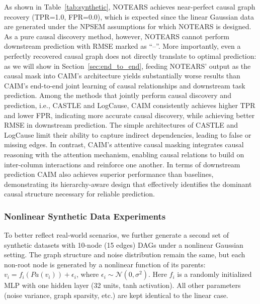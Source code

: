 \documentclass[sigconf, nonacm]{acmart}
\newcommand{\sydesi}[1]{{\color{black}#1}}
\newcommand{\syexp}[1]{{\color{black}#1}}
\newcommand{\syfix}[1]{{\color{black}#1}}
\newcommand*{\ourmodel}{CAIM}
\begin{document}
\syfix{As shown in Table~\ref{tab:synthetic}, NOTEARS achieves near-perfect causal graph recovery (TPR=1.0, FPR=0.0), which is expected since the linear Gaussian data are generated under the NPSEM assumptions for which NOTEARS is designed. 
As a pure causal discovery method, however, NOTEARS cannot perform downstream prediction with RMSE marked as ``--''. 
More importantly, even a perfectly recovered causal graph does not directly translate to optimal prediction: as we will show in Section~\ref{sec:end_to_end}, feeding NOTEARS' output as the causal mask into \ourmodel{}'s architecture yields substantially worse results than \ourmodel{}'s end-to-end joint learning of causal relationships and downstream task prediction.
Among the methods that jointly perform causal discovery and prediction, i.e., CASTLE and LogCause, \ourmodel{} consistently achieves higher TPR and lower FPR, indicating more accurate causal discovery, while achieving better RMSE in downstream prediction.
}
\sydesi{The simple architectures of CASTLE and LogCause limit their}
ability to capture indirect dependencies, leading to false or missing edges.
In contrast, \ourmodel{}’s attentive causal masking integrates causal reasoning with the attention mechanism, enabling causal relations to build on inter-column interactions and reinforce one another.
\sydesi{
In terms of downstream prediction
\ourmodel{} also achieves superior performance than baselines, demonstrating its hierarchy-aware design that effectively identifies the dominant causal structure necessary for reliable prediction.}

\subsubsection{Nonlinear Synthetic Data Experiments}

\syexp{To better reflect real-world scenarios, we further generate a second set of synthetic datasets with \syfix{10-node (15 edges) }DAGs under a nonlinear Gaussian setting.
The graph structure and noise distribution remain the same, but each non-root node is generated by a nonlinear function of its parents:
$v_i = f_i(Pa(v_i)) + \epsilon_i$, where $\epsilon_i \sim \mathcal{N}(0, \sigma^2)$. Here $f_i$ is a randomly initialized MLP with one hidden layer (32 units, tanh activation). All other parameters (noise variance, graph sparsity, etc.) are kept identical to the linear case.
}
\end{document}
